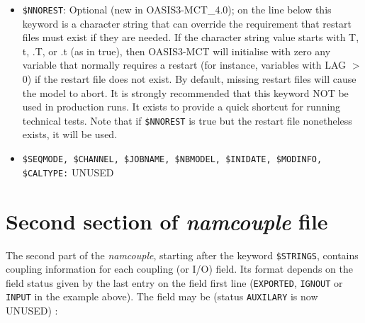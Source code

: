 \begin{itemize}
\item {\tt \$NNOREST}: Optional (new in OASIS3-MCT\_4.0); on the line below this keyword is a character
  string that can override the requirement that restart files must exist
  if they are needed.  If the character string value starts with T, t, .T, 
  or .t (as in true), then OASIS3-MCT will initialise with zero any variable that normally requires
  a restart (for instance, variables with LAG $>$ 0) if the restart file does not exist. By default, missing
  restart files will cause the model to abort.  It is strongly recommended
  that this keyword NOT be used in production runs.  It exists to provide a 
  quick shortcut for running technical tests. 
  Note that if {\tt \$NNOREST} is true but the restart file nonetheless exists, it will be used.
 
\item {\tt \$SEQMODE, \$CHANNEL, \$JOBNAME, \$NBMODEL, \$INIDATE, \$MODINFO, \$CALTYPE:} UNUSED

\end{itemize}


\section{Second section of {\it namcouple} file }
\label{subsec_namcouplesecond}

The second part of the {\it namcouple}, starting after the keyword
{\tt \$STRINGS}, contains coupling information for each coupling (or
I/O) field.  Its format depends on the field status given by the last
entry on the field first line ({\tt EXPORTED}, {\tt IGNOUT} or {\tt
  INPUT} in the example above). The field may be (status {\tt AUXILARY} is now UNUSED) :

